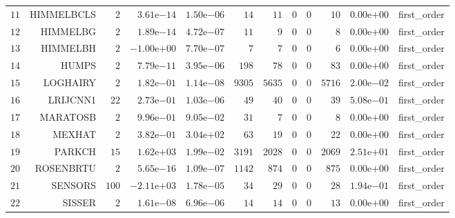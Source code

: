 \begin{longtable}{rrrrrrrrrrrr}
  \(    11\) & HIMMELBCLS & \(     2\) & \( 3.61\)e\(-14\) & \( 1.50\)e\(-06\) & \(    14\) & \(    11\) & \(     0\) & \(     0\) & \(    10\) & \( 0.00\)e\(+00\) & first\_order \\
  \(    12\) & HIMMELBG & \(     2\) & \( 1.89\)e\(-14\) & \( 4.72\)e\(-07\) & \(    11\) & \(     9\) & \(     0\) & \(     0\) & \(     8\) & \( 0.00\)e\(+00\) & first\_order \\
  \(    13\) & HIMMELBH & \(     2\) & \(-1.00\)e\(+00\) & \( 7.70\)e\(-07\) & \(     7\) & \(     7\) & \(     0\) & \(     0\) & \(     6\) & \( 0.00\)e\(+00\) & first\_order \\
  \(    14\) & HUMPS & \(     2\) & \( 7.79\)e\(-11\) & \( 3.95\)e\(-06\) & \(   198\) & \(    78\) & \(     0\) & \(     0\) & \(    83\) & \( 0.00\)e\(+00\) & first\_order \\
  \(    15\) & LOGHAIRY & \(     2\) & \( 1.82\)e\(-01\) & \( 1.14\)e\(-08\) & \(  9305\) & \(  5635\) & \(     0\) & \(     0\) & \(  5716\) & \( 2.00\)e\(-02\) & first\_order \\
  \(    16\) & LRIJCNN1 & \(    22\) & \( 2.73\)e\(-01\) & \( 1.03\)e\(-06\) & \(    49\) & \(    40\) & \(     0\) & \(     0\) & \(    39\) & \( 5.08\)e\(-01\) & first\_order \\
  \(    17\) & MARATOSB & \(     2\) & \( 9.96\)e\(-01\) & \( 9.05\)e\(-02\) & \(    31\) & \(     7\) & \(     0\) & \(     0\) & \(     8\) & \( 0.00\)e\(+00\) & first\_order \\
  \(    18\) & MEXHAT & \(     2\) & \( 3.82\)e\(-01\) & \( 3.04\)e\(+02\) & \(    63\) & \(    19\) & \(     0\) & \(     0\) & \(    22\) & \( 0.00\)e\(+00\) & first\_order \\
  \(    19\) & PARKCH & \(    15\) & \( 1.62\)e\(+03\) & \( 1.99\)e\(-02\) & \(  3191\) & \(  2028\) & \(     0\) & \(     0\) & \(  2069\) & \( 2.51\)e\(+01\) & first\_order \\
  \(    20\) & ROSENBRTU & \(     2\) & \( 5.65\)e\(-16\) & \( 1.09\)e\(-07\) & \(  1142\) & \(   874\) & \(     0\) & \(     0\) & \(   875\) & \( 0.00\)e\(+00\) & first\_order \\
  \(    21\) & SENSORS & \(   100\) & \(-2.11\)e\(+03\) & \( 1.78\)e\(-05\) & \(    34\) & \(    29\) & \(     0\) & \(     0\) & \(    28\) & \( 1.94\)e\(-01\) & first\_order \\
  \(    22\) & SISSER & \(     2\) & \( 1.61\)e\(-08\) & \( 6.96\)e\(-06\) & \(    14\) & \(    14\) & \(     0\) & \(     0\) & \(    13\) & \( 0.00\)e\(+00\) & first\_order \\

\end{longtable}
